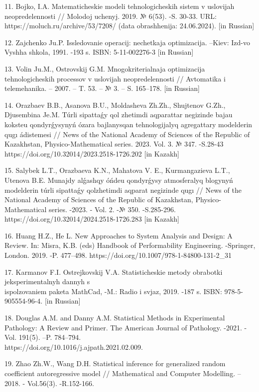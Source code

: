 \begin{noparindent}
11. Bojko, I.A. Matematicheskie modeli tehnologicheskih sistem v
uslovijah neopredelennosti // Molodoj uchenyj. 2019. № 6(53). -S. 30-33.
URL: https://moluch.ru/archive/53/7208/ (data obrashhenija: 24.06.2024).
{[}in Russian{]}

12. Zajchenko Ju.P. Issledovanie operacij: nechetkaja optimizacija.
--Kiev: Izd-vo Vyshha shkola, 1991. -193 s. ISBN: 5-11-002276-3 {[}in
Russian{]}

13. Volin Ju.M., Ostrovskij G.M. Mnogokriterial\textquotesingle naja
optimizacija tehnologicheskih processov v uslovijah neopredelennosti //
Avtomatika i telemehanika. -- 2007. -- T. 53. -- № 3. -- S. 165--178.
{[}in Russian{]}

14. Orazbaev B.B., Asanova B.U., Moldasheva Zh.Zh., Shujtenov G.Zh.,
Djusembina Je.M. Túrli sipattaǵy qol zhetimdi aqparattar negizinde bajau
koksteu qondyrǵysynyń ózara bajlanysqan tehnologijalyq agregattary
model\textquotesingle derin qugı ádistemesi // News of the National
Academy of Sciences of the Republic of Kazakhstan, Physico-Mathematical
series. 2023. Vol. 3. № 347. -S.28-43
https://doi.org/10.32014/2023.2518-1726.202 {[}in Kazakh{]}

15. Salybek L.T., Orazbaeva K.N., Mahatova V. E., Kurmangazieva L.T.,
Utenova B.E. Munajdy alǵashqy óńdeu qondyrǵysy atmosferalyq blogynyń
model\textquotesingle derin túrli sipattaǵy qolzhetimdi aqparat
negizinde qugı // News of the National Academy of Sciences of the
Republic of Kazakhstan, Physico-Mathematical series. -2023. - Vol. 2. -№
350. -S.285-296. https://doi.org/10.32014/2024.2518-1726.283 {[}in
Kazakh{]}

16. Huang H.Z., He L. New Approaches to System Analysis and Design: A
Review. In: Misra, K.B. (eds) Handbook of Performability Engineering.
-Springer, London. 2019. -P. 477--498.
https://doi.org/10.1007/978-1-84800-131-2\_31

17. Karmanov F.I. Ostrejkovskij V.A. Statisticheskie metody obrabotki
jeksperimental\textquotesingle nyh dannyh s \\
ispol\textquotesingle zovaniem paketa MathCad, -M.: Radio i
svjaz\textquotesingle, 2019. -187 s. ISBN: 978-5-905554-96-4. {[}in
Russian{]}

18. Douglas A.M. and Danny A.M. Statistical Methods in Experimental
Pathology: A Review and Primer. The American Journal of Pathology.
-2021. -Vol. 191(5). --P. 784--794. \\
https://doi.org/10.1016/j.ajpath.2021.02.009.

19. Zhao Zh.W., Wang D.H. Statistical inference for generalized random
coefficient autoregressive model // Mathematical and Computer Modelling.
-- 2018. - Vol.56(3). -R.152-166.


\end{noparindent}
